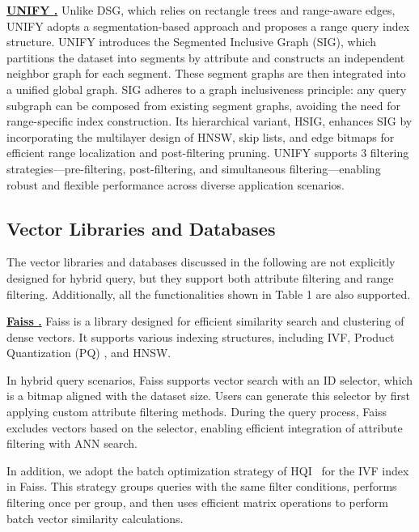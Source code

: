 \documentclass[sigconf, nonacm]{acmart}
\begin{document}
\noindent\textbf{\underline{UNIFY \cite{UNIFY}.}}  
Unlike DSG, which relies on rectangle trees and range-aware edges, UNIFY adopts a segmentation-based approach and proposes a range query index structure. UNIFY introduces the Segmented Inclusive Graph (SIG), which partitions the dataset into segments by attribute and constructs an independent neighbor graph for each segment. These segment graphs are then integrated into a unified global graph. SIG adheres to a graph inclusiveness principle: any query subgraph can be composed from existing segment graphs, avoiding the need for range-specific index construction. Its hierarchical variant, HSIG, enhances SIG by incorporating the multilayer design of HNSW, skip lists, and edge bitmaps for efficient range localization and post-filtering pruning. UNIFY supports 3 filtering strategies—pre-filtering, post-filtering, and  simultaneous filtering—enabling robust and flexible performance across diverse application scenarios.



\subsection{Vector Libraries and Databases}

The vector libraries and databases discussed in the following are not explicitly designed for hybrid query, but they support both attribute filtering and range filtering. Additionally, all the functionalities shown in Table 1 are also supported.


\noindent\textbf{\underline{Faiss \cite{Faiss}.}} Faiss is a library designed for efficient similarity search and clustering of dense vectors. It supports various indexing structures, including IVF, Product Quantization (PQ) \cite{PQ}, and HNSW.

In hybrid query scenarios, Faiss supports vector search with an ID selector, which is a bitmap aligned with the dataset size. Users can generate this selector by first applying custom attribute filtering methods. During the query process, Faiss excludes vectors based on the selector, enabling efficient integration of attribute filtering with ANN search.

In addition, we adopt the batch optimization strategy of HQI~\cite{HQI} for the IVF index in Faiss. This strategy groups queries with the same filter conditions, performs filtering once per group, and then uses efficient matrix operations to perform batch vector similarity calculations.
\end{document}
